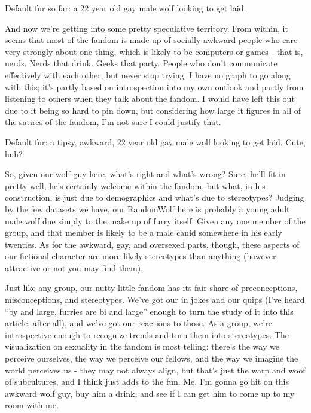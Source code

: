 Default fur so far: a 22 year old gay male wolf looking to get laid.

And now we're getting into some pretty speculative territory. From within, it seems that most of the fandom is made up of socially awkward people who care very strongly about one thing, which is likely to be computers or games - that is, nerds. Nerds that drink. Geeks that party. People who don't communicate effectively with each other, but never stop trying. I have no graph to go along with this; it's partly based on introspection into my own outlook and partly from listening to others when they talk about the fandom. I would have left this out due to it being so hard to pin down, but considering how large it figures in all of the satires of the fandom, I'm not sure I could justify that.

Default fur: a tipsy, awkward, 22 year old gay male wolf looking to get laid. Cute, huh?

So, given our wolf guy here, what's right and what's wrong? Sure, he'll fit in pretty well, he's certainly welcome within the fandom, but what, in his construction, is just due to demographics and what's due to stereotypes? Judging by the few datasets we have, our RandomWolf here is probably a young adult male wolf due simply to the make up of furry itself. Given any one member of the group, and that member is likely to be a male canid somewhere in his early twenties. As for the awkward, gay, and oversexed parts, though, these aspects of our fictional character are more likely stereotypes than anything (however attractive or not you may find them).

Just like any group, our nutty little fandom has its fair share of preconceptions, misconceptions, and stereotypes. We've got our in jokes and our quips (I've heard ``by and large, furries are bi and large'' enough to turn the study of it into this article, after all), and we've got our reactions to those. As a group, we're introspective enough to recognize trends and turn them into stereotypes. The visualization on sexuality in the fandom is most telling: there's the way we perceive ourselves, the way we perceive our fellows, and the way we imagine the world perceives us - they may not always align, but that's just the warp and woof of subcultures, and I think just adds to the fun. Me, I'm gonna go hit on this awkward wolf guy, buy him a drink, and see if I can get him to come up to my room with me.
